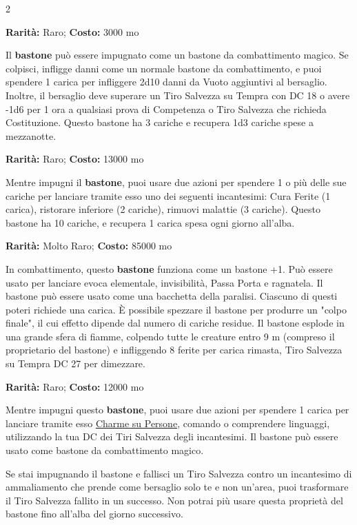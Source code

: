 \begin{multicols}{2}

\textbf{Rarità:} Raro; \textbf{Costo:} 3000 mo

Il \textbf{bastone} può essere impugnato come un bastone da combattimento magico. Se colpisci, infligge danni come un normale bastone da combattimento, e puoi spendere 1 carica per infliggere 2d10 danni da Vuoto aggiuntivi al bersaglio. Inoltre, il bersaglio deve superare un Tiro Salvezza su Tempra con DC 18 o avere -1d6 per 1 ora a qualsiasi prova di Competenza o Tiro Salvezza che richieda Costituzione. Questo bastone ha 3 cariche e recupera 1d3 cariche spese a mezzanotte.


\textbf{Rarità:} Raro; \textbf{Costo:} 13000 mo

Mentre impugni il \textbf{bastone}, puoi usare due azioni per spendere 1 o più delle sue cariche per lanciare tramite esso uno dei seguenti incantesimi: Cura Ferite (1 carica), ristorare inferiore (2 cariche), rimuovi malattie (3 cariche). Questo bastone ha 10 cariche, e recupera 1 carica spesa ogni giorno all'alba.


\textbf{Rarità:} Molto Raro; \textbf{Costo:} 85000 mo

In combattimento, questo \textbf{bastone} funziona come un bastone +1. Può essere usato per lanciare evoca elementale, invisibilità, Passa Porta e ragnatela. Il bastone può essere usato come una bacchetta della paralisi. Ciascuno di questi poteri richiede una carica. È possibile spezzare il bastone per produrre un "colpo finale", il cui effetto dipende dal numero di cariche residue. Il bastone esplode in una grande sfera di fiamme, colpendo tutte le creature entro 9 m (compreso il proprietario del bastone) e infliggendo 8 ferite per carica rimasta, Tiro Salvezza su Tempra DC 27 per dimezzare.


\textbf{Rarità:} Raro; \textbf{Costo:} 12000 mo

Mentre impugni questo \textbf{bastone}, puoi usare due azioni per spendere 1 carica per lanciare tramite esso \hyperlink{Charme su Persone}{Charme su Persone}, comando o comprendere linguaggi, utilizzando la tua DC dei Tiri Salvezza degli incantesimi. Il bastone può essere usato come bastone da combattimento magico.

Se stai impugnando il bastone e fallisci un Tiro Salvezza contro un incantesimo di ammaliamento che prende come bersaglio solo te e non un'area, puoi trasformare il Tiro Salvezza fallito in un successo. Non potrai più usare questa proprietà del bastone fino all'alba del giorno successivo.


\end{multicols}
